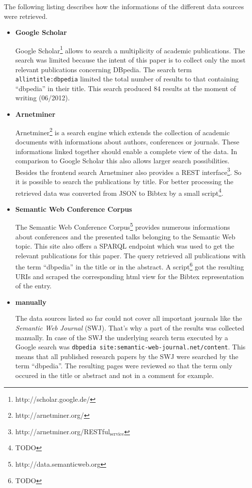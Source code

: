 \documentclass[english]{lni}
\begin{document}
   The following listing describes how the informations of the
   different data sources were retrieved.
\begin{itemize}
\item \textbf{Google Scholar}

     Google Scholar\footnote{http://scholar.google.de/ } allows to search a multiplicity of academic
     publications. The search was limited because the intent of this paper is to
     collect only the most relevant publications concerning DBpedia. The search
     term \texttt{allintitle:dbpedia} limited the total number of results to that
     containing ``dbpedia'' in their title. This search produced 84 results at the
     moment of writing (06/2012).
\item \textbf{Arnetminer}

     Arnetminer\footnote{http://arnetminer.org/ } is a search engine which extends the collection of
     academic documents with informations about authors, conferences or
     journals. These informations linked together should enable a complete view
     of the data. In comparison to Google Scholar this also allows larger search
     possibilities. Besides the frontend search Arnetminer also provides a REST
     interface\footnote{http://arnetminer.org/RESTful$_{\mathrm{service}}$ }. So it is possible to search the publications by title. For
     better processing the retrieved data was converted from JSON to Bibtex by a
     small script\footnote{TODO }.
\item \textbf{Semantic Web Conference Corpus}

     The Semantic Web Conference Corpus\footnote{http://data.semanticweb.org } provides numerous informations about
     conferences and the presented talks belonging to the Semantic Web
     topic. This site also offers a SPARQL endpoint which was used to get the
     relevant publications for this paper. The query retrieved all publications
     with the term ``dbpedia'' in the title or in the abstract. A script\footnote{TODO } got
     the resulting URIs and scraped the corresponding html view for the Bibtex
     representation of the entry.
\item \textbf{manually}

     The data sources listed so far could not cover all important journals like
     the \emph{Semantic Web Journal} (SWJ). That's why a part of the results was
     collected manually. In case of the SWJ the underlying search term executed by a Google
     search was \texttt{dbpedia site:semantic-web-journal.net/content}. This means that all published research papers by the SWJ were
     searched by the term ``dbpedia''. The resulting pages were reviewed so that the
     term only occured in the title or abstract and not in a comment for example.
\end{itemize}
\end{document}
